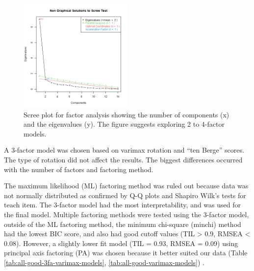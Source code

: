 \documentclass[020-persona\_validation.tex]{subfiles}
\begin{document}
        \begin{figure}[!htbp]
            \centering
            \includegraphics[width=0.5\textwidth]{figs/010-validation/efa_eigen_scree_good.png}
            \caption[Scree plot for factor analysis]
            {Scree plot for factor analysis showing the number of components (x) and the eigenvalues (y).
                The figure suggests exploring 2 to 4-factor models.
            }
            \label{fig:scree-fa-good}
        \end{figure}

        A 3-factor model was chosen based on
        varimax rotation and
        ``ten Berge'' scores.
        The type of rotation did not affect the results.
        The biggest differences occurred with the number of factors and factoring method.

        The maximum likelihood (ML) factoring method was ruled out because data was not normally distributed
        as confirmed by Q-Q plots and Shapiro Wilk's tests for teach item. %
        The 3-factor model had the most interpretability, and was used for the final model.
        Multiple factoring methods were tested using the 3-factor model,
        outside of the ML factoring method, the minimum chi-square (minchi) method had the lowest BIC score,
        and also had good cutoff values (TIL > 0.9, RMSEA < 0.08).
        However, a slightly lower fit model (TIL = 0.93, RMSEA = 0.09) using principal axis factoring (PA)
        was chosen because it better suited our data
        (Table \ref{tab:all-good-3fa-varimax-models}, \ref{tab:all-good-varimax-models})
        \cite{arifinExploratoryFactorAnalysis2017, brownConfirmatoryFactorAnalysis2015}.
\end{document}
